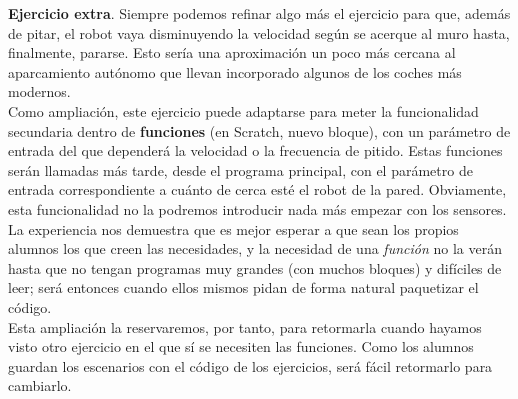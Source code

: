 \begin{description}
\textbf{Ejercicio extra}. Siempre podemos refinar algo más el ejercicio para que, además de pitar, el robot vaya disminuyendo la velocidad según se acerque al muro hasta, finalmente, pararse. Esto sería una aproximación un poco más cercana al aparcamiento autónomo que llevan incorporado algunos de los coches más modernos.\\
Como ampliación, este ejercicio puede adaptarse para meter la funcionalidad secundaria dentro de \textbf{funciones} (en Scratch, nuevo bloque), con un parámetro de entrada del que dependerá la velocidad o la frecuencia de pitido. Estas funciones serán llamadas más tarde, desde el programa principal, con el parámetro de entrada correspondiente a cuánto de cerca esté el robot de la pared. Obviamente, esta funcionalidad no la podremos introducir nada más empezar con los sensores. La experiencia nos demuestra que es mejor esperar a que sean los propios alumnos los que creen las necesidades, y la necesidad de una \textit{función} no la verán hasta que no tengan programas muy grandes (con muchos bloques) y difíciles de leer; será entonces cuando ellos mismos pidan de forma natural paquetizar el código.\\
Esta ampliación la reservaremos, por tanto, para retormarla cuando hayamos visto otro ejercicio en el que sí se necesiten las funciones. Como los alumnos guardan los escenarios con el código de los ejercicios, será fácil retormarlo para cambiarlo.


\end{description}
